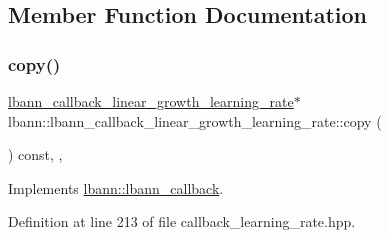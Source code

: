\subsection{Member Function Documentation}
\mbox{\label{classlbann_1_1lbann__callback__linear__growth__learning__rate_aadb1266a360c5442e094113b919f6c13}} 
\subsubsection{\texorpdfstring{copy()}{copy()}}
{\footnotesize\ttfamily \hyperlink{classlbann_1_1lbann__callback__linear__growth__learning__rate}{lbann\+\_\+callback\+\_\+linear\+\_\+growth\+\_\+learning\+\_\+rate}$\ast$ lbann\+::lbann\+\_\+callback\+\_\+linear\+\_\+growth\+\_\+learning\+\_\+rate\+::copy (\begin{DoxyParamCaption}{ }\end{DoxyParamCaption}) const\hspace{0.3cm}{\ttfamily [inline]}, {\ttfamily [override]}, {\ttfamily [virtual]}}



Implements \hyperlink{classlbann_1_1lbann__callback_a9f545d1269a8c7af335625d049691f26}{lbann\+::lbann\+\_\+callback}.



Definition at line 213 of file callback\+\_\+learning\+\_\+rate.\+hpp.


